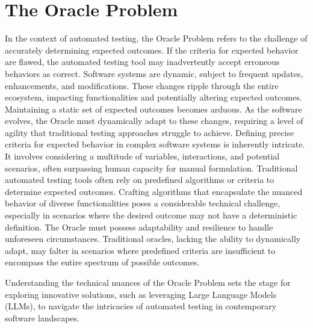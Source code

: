 \section{The Oracle Problem}
\label{sec:oracle_problem}
\vspace{0.2 cm}

In the context of automated testing, the Oracle Problem refers to the challenge of accurately determining expected outcomes. If the criteria for expected behavior are flawed, the automated testing tool may inadvertently accept erroneous behaviors as correct. 
Software systems are dynamic, subject to frequent updates, enhancements, and modifications. These changes ripple through the entire ecosystem, impacting functionalities and potentially altering expected outcomes. Maintaining a static set of expected outcomes becomes arduous. As the software evolves, the Oracle must dynamically adapt to these changes, requiring a level of agility that traditional testing approaches struggle to achieve. Defining precise criteria for expected behavior in complex software systems is inherently intricate. It involves considering a multitude of variables, interactions, and potential scenarios, often surpassing human capacity for manual formulation. Traditional automated testing tools often rely on predefined algorithms or criteria to determine expected outcomes. Crafting algorithms that encapsulate the nuanced behavior of diverse functionalities poses a considerable technical challenge, especially in scenarios where the desired outcome may not have a deterministic definition. The Oracle must possess adaptability and resilience to handle unforeseen circumstances. Traditional oracles, lacking the ability to dynamically adapt, may falter in scenarios where predefined criteria are insufficient to encompass the entire spectrum of possible outcomes\cite{li_software_2022}.

Understanding the technical nuances of the Oracle Problem sets the stage for exploring innovative solutions, such as leveraging Large Language Models (LLMs), to navigate the intricacies of automated testing in contemporary software landscapes.